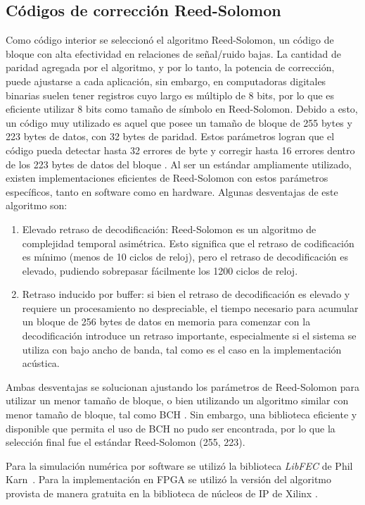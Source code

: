 \subsection{Códigos de corrección Reed-Solomon}
Como código interior se seleccionó el algoritmo Reed-Solomon, un código de bloque con alta efectividad en relaciones de señal/ruido bajas. La cantidad de paridad agregada por el algoritmo, y por lo tanto, la potencia de corrección, puede ajustarse a cada aplicación, sin embargo, en computadoras digitales binarias suelen tener registros cuyo largo es múltiplo de 8 bits, por lo que es eficiente utilizar 8 bits como tamaño de símbolo en Reed-Solomon. Debido a esto, un código muy utilizado es aquel que posee un tamaño de bloque de 255 bytes y 223 bytes de datos, con 32 bytes de paridad. Estos parámetros logran que el código pueda detectar hasta 32 errores de byte y corregir hasta 16 errores dentro de los 223 bytes de datos del bloque \cite{wicker1999reed}. Al ser un estándar ampliamente utilizado, existen implementaciones eficientes de Reed-Solomon con estos parámetros específicos, tanto en software como en hardware.
Algunas desventajas de este algoritmo son:
\begin{enumerate}
 \item Elevado retraso de decodificación: Reed-Solomon es un algoritmo de complejidad temporal asimétrica. Esto significa que el retraso de codificación es mínimo (menos de 10 ciclos de reloj), pero el retraso de decodificación es elevado, pudiendo sobrepasar fácilmente los 1200 ciclos de reloj.
 \item Retraso inducido por buffer: si bien el retraso de decodificación es elevado y requiere un procesamiento no despreciable, el tiempo necesario para acumular un bloque de 256 bytes de datos en memoria para comenzar con la decodificación introduce un retraso importante, especialmente si el sistema se utiliza con bajo ancho de banda, tal como es el caso en la implementación acústica.
\end{enumerate}
 
Ambas desventajas se solucionan ajustando los parámetros de Reed-Solomon para utilizar un menor tamaño de bloque, o bien utilizando un algoritmo similar con menor tamaño de bloque, tal como BCH \cite{bose1960class}. Sin embargo, una biblioteca eficiente y disponible que permita el uso de BCH no pudo ser encontrada, por lo que la selección final fue el estándar Reed-Solomon (255, 223).

Para la simulación numérica por software se utilizó la biblioteca \textit{LibFEC} de Phil Karn~\cite{libfec}. Para la implementación en FPGA se utilizó la versión del algoritmo provista de manera gratuita en la biblioteca de núcleos de IP de Xilinx \cite{Xilinx:DS251}.

